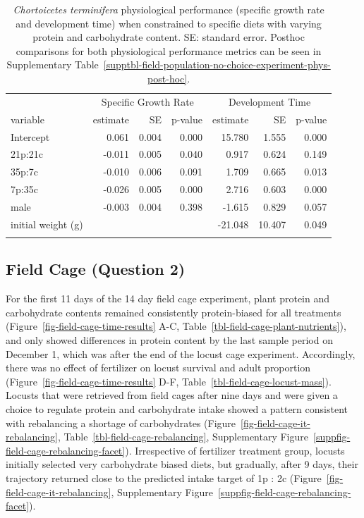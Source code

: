 \documentclass[
]{article}
\begin{document}
\begin{longtable}{lrrrrrr}

\toprule
 & \multicolumn{3}{c}{Specific Growth Rate} & \multicolumn{3}{c}{Development Time} \\ 
\cmidrule(lr){2-4} \cmidrule(lr){5-7}
variable & estimate & SE & p-value & estimate & SE & p-value \\ 
\midrule\addlinespace[2.5pt]
Intercept & 0.061 & 0.004 & 0.000 & 15.780 & 1.555 & 0.000 \\ 
21p:21c & -0.011 & 0.005 & 0.040 & 0.917 & 0.624 & 0.149 \\ 
35p:7c & -0.010 & 0.006 & 0.091 & 1.709 & 0.665 & 0.013 \\ 
7p:35c & -0.026 & 0.005 & 0.000 & 2.716 & 0.603 & 0.000 \\ 
male & -0.003 & 0.004 & 0.398 & -1.615 & 0.829 & 0.057 \\ 
initial weight (g) &  &  &  & -21.048 & 10.407 & 0.049 \\ 
\bottomrule

\caption{\label{tbl-field-population-no-choice-model}\emph{Chortoicetes
terminifera} physiological performance (specific growth rate and
development time) when constrained to specific diets with varying
protein and carbohydrate content. SE: standard error. Posthoc
comparisons for both physiological performance metrics can be seen in
Supplementary Table~\ref{supptbl-field-population-no-choice-experiment-phys-post-hoc}.}

\tabularnewline

\end{longtable}

\endgroup

\subsection{Field Cage (Question 2)}\label{field-cage-question-2}

For the first 11 days of the 14 day field cage experiment, plant protein
and carbohydrate contents remained consistently protein-biased for all
treatments (Figure~\ref{fig-field-cage-time-results} A-C,
Table~\ref{tbl-field-cage-plant-nutrients}), and only showed differences
in protein content by the last sample period on December 1, which was
after the end of the locust cage experiment. Accordingly, there was no
effect of fertilizer on locust survival and adult proportion
(Figure~\ref{fig-field-cage-time-results} D-F,
Table~\ref{tbl-field-cage-locust-mass}). Locusts that were retrieved
from field cages after nine days and were given a choice to regulate
protein and carbohydrate intake showed a pattern consistent with
rebalancing a shortage of carbohydrates
(Figure~\ref{fig-field-cage-it-rebalancing},
Table~\ref{tbl-field-cage-rebalancing},
Supplementary Figure~\ref{suppfig-field-cage-rebalancing-facet}).
Irrespective of fertilizer treatment group, locusts initially selected
very carbohydrate biased diets, but gradually, after 9 days, their
trajectory returned close to the predicted intake target of 1p : 2c
(Figure~\ref{fig-field-cage-it-rebalancing},
Supplementary Figure~\ref{suppfig-field-cage-rebalancing-facet}).
\end{document}
